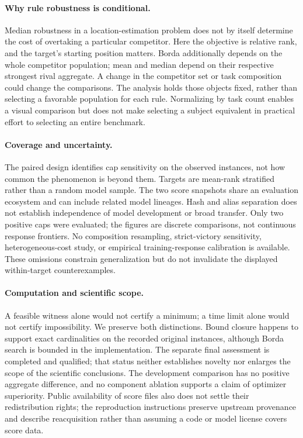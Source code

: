 \documentclass{article}
\begin{document}
\paragraph{Why rule robustness is conditional.}
Median robustness in a location-estimation problem does not by itself determine the cost of overtaking a particular competitor. Here the objective is relative rank, and the target's starting position matters. Borda additionally depends on the whole competitor population; mean and median depend on their respective strongest rival aggregate. A change in the competitor set or task composition could change the comparisons. The analysis holds those objects fixed, rather than selecting a favorable population for each rule. Normalizing by task count enables a visual comparison but does not make selecting a subject equivalent in practical effort to selecting an entire benchmark.

\paragraph{Coverage and uncertainty.}
The paired design identifies cap sensitivity on the observed instances, not how common the phenomenon is beyond them. Targets are mean-rank stratified rather than a random model sample. The two score snapshots share an evaluation ecosystem and can include related model lineages. Hash and alias separation does not establish independence of model development or broad transfer. Only two positive caps were evaluated; the figures are discrete comparisons, not continuous response frontiers. No composition resampling, strict-victory sensitivity, heterogeneous-cost study, or empirical training-response calibration is available. These omissions constrain generalization but do not invalidate the displayed within-target counterexamples.

\paragraph{Computation and scientific scope.}
A feasible witness alone would not certify a minimum; a time limit alone would not certify impossibility. We preserve both distinctions. Bound closure happens to support exact cardinalities on the recorded original instances, although Borda search is bounded in the implementation. The separate final assessment is completed and qualified; that status neither establishes novelty nor enlarges the scope of the scientific conclusions. The development comparison has no positive aggregate difference, and no component ablation supports a claim of optimizer superiority. Public availability of score files also does not settle their redistribution rights; the reproduction instructions preserve upstream provenance and describe reacquisition rather than assuming a code or model license covers score data.
\end{document}
